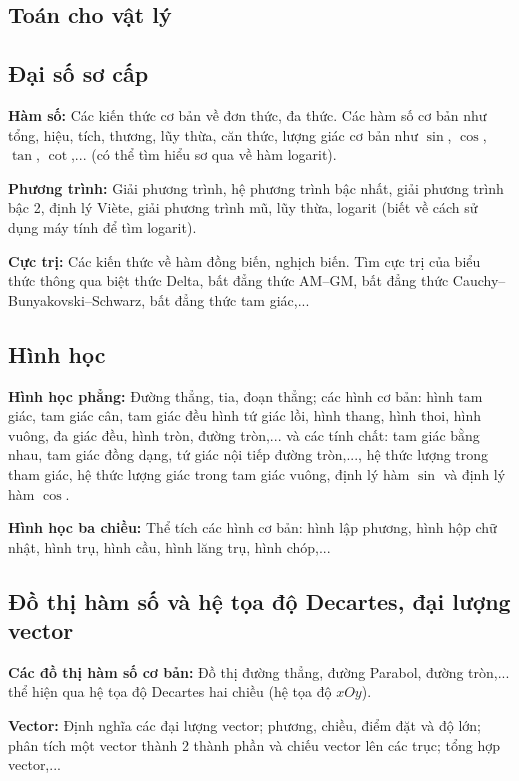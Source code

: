 \documentclass{article}
\begin{document}
\begin{multicols}{2}
\section{Toán cho vật lý}

\subsection{Đại số sơ cấp}

\noindent \textbf{Hàm số:} Các kiến thức cơ bản về đơn thức, đa thức. Các hàm số cơ bản như tổng, hiệu, tích, thương, lũy thừa, căn thức, lượng giác cơ bản như $\sin$, $\cos$, $\tan$, $\cot$,... (có thể tìm hiểu sơ qua về hàm logarit).

\noindent \textbf{Phương trình:} Giải phương trình, hệ phương trình bậc nhất, giải phương trình bậc 2, định lý Viète, giải phương trình mũ, lũy thừa, logarit (biết về cách sử dụng máy tính để tìm logarit).

\noindent \textbf{Cực trị:} Các kiến thức về hàm đồng biến, nghịch biến. Tìm cực trị của biểu thức thông qua biệt thức Delta, bất đẳng thức AM–GM, bất đẳng thức Cauchy–Bunyakovski–Schwarz, bất đẳng thức tam giác,...

\subsection{Hình học}

\noindent \textbf{Hình học phẳng:} Đường thẳng, tia, đoạn thẳng; các hình cơ bản: hình tam giác, tam giác cân, tam giác đều hình tứ giác lồi, hình thang, hình thoi, hình vuông, đa giác đều, hình tròn, đường tròn,... và các tính chất: tam giác bằng nhau, tam giác đồng dạng, tứ giác nội tiếp đường tròn,..., hệ thức lượng trong tham giác, hệ thức lượng giác trong tam giác vuông, định lý hàm $\sin$ và định lý hàm $\cos$.

\noindent \textbf{Hình học ba chiều:} Thể tích các hình cơ bản: hình lập phương, hình hộp chữ nhật, hình trụ, hình cầu, hình lăng trụ, hình chóp,...

\subsection{Đồ thị hàm số và hệ tọa độ Decartes, đại lượng vector}

\noindent \textbf{Các đồ thị hàm số cơ bản:} Đồ thị đường thẳng, đường Parabol, đường tròn,... thể hiện qua hệ tọa độ Decartes hai chiều (hệ tọa độ $xOy$).

\noindent \textbf{Vector:} Định nghĩa các đại lượng vector; phương, chiều, điểm đặt và độ lớn; phân tích một vector thành 2 thành phần và chiếu vector lên các trục; tổng hợp vector,...


\end{multicols}
\end{document}
